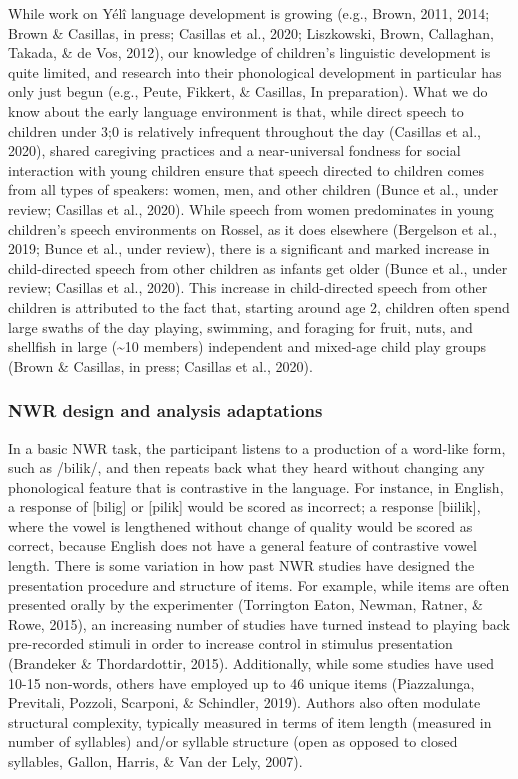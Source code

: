\documentclass[english,,man,floatsintext]{apa6}
\begin{document}
While work on Yélî language development is growing (e.g., Brown, 2011,
2014; Brown \& Casillas, in press; Casillas et al., 2020; Liszkowski,
Brown, Callaghan, Takada, \& de Vos, 2012), our knowledge of children's
linguistic development is quite limited, and research into their
phonological development in particular has only just begun (e.g., Peute,
Fikkert, \& Casillas, In preparation). What we do know about the early
language environment is that, while direct speech to children under 3;0
is relatively infrequent throughout the day (Casillas et al., 2020),
shared caregiving practices and a near-universal fondness for social
interaction with young children ensure that speech directed to children
comes from all types of speakers: women, men, and other children (Bunce
et al., under review; Casillas et al., 2020). While speech from women
predominates in young children's speech environments on Rossel, as it
does elsewhere (Bergelson et al., 2019; Bunce et al., under review),
there is a significant and marked increase in child-directed speech from
other children as infants get older (Bunce et al., under review;
Casillas et al., 2020). This increase in child-directed speech from
other children is attributed to the fact that, starting around age 2,
children often spend large swaths of the day playing, swimming, and
foraging for fruit, nuts, and shellfish in large (\textasciitilde{}10
members) independent and mixed-age child play groups (Brown \& Casillas,
in press; Casillas et al., 2020).

\subsubsection{NWR design and analysis
adaptations}\label{nwr-design-and-analysis-adaptations}

In a basic NWR task, the participant listens to a production of a
word-like form, such as /bilik/, and then repeats back what they heard
without changing any phonological feature that is contrastive in the
language. For instance, in English, a response of {[}bilig{]} or
{[}pilik{]} would be scored as incorrect; a response {[}biilik{]}, where
the vowel is lengthened without change of quality would be scored as
correct, because English does not have a general feature of contrastive
vowel length. There is some variation in how past NWR studies have
designed the presentation procedure and structure of items. For example,
while items are often presented orally by the experimenter (Torrington
Eaton, Newman, Ratner, \& Rowe, 2015), an increasing number of studies
have turned instead to playing back pre-recorded stimuli in order to
increase control in stimulus presentation (Brandeker \& Thordardottir,
2015). Additionally, while some studies have used 10-15 non-words,
others have employed up to 46 unique items (Piazzalunga, Previtali,
Pozzoli, Scarponi, \& Schindler, 2019). Authors also often modulate
structural complexity, typically measured in terms of item length
(measured in number of syllables) and/or syllable structure (open as
opposed to closed syllables, Gallon, Harris, \& Van der Lely, 2007).
\end{document}

